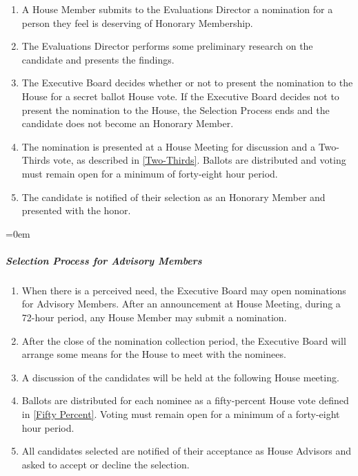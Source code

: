 \documentclass{article}
\newcommand{\asubsubsubsection}[1]{\parindent=0em\subparagraph{#1} \label{#1}}
\begin{document}
\begin{enumerate}
	\item A House Member submits to the Evaluations Director a nomination for a person they feel is deserving of Honorary Membership.
	\item The Evaluations Director performs some preliminary research on the candidate and presents the findings.
	\item The Executive Board decides whether or not to present the nomination to the House for a secret ballot House vote.
		If the Executive Board decides not to present the nomination to the House, the Selection Process ends and the candidate does not become an Honorary Member.
	\item The nomination is presented at a House Meeting for discussion and a Two-Thirds vote, as described in \ref{Two-Thirds}.
		Ballots are distributed and voting must remain open for a minimum of forty-eight hour period.
	\item The candidate is notified of their selection as an Honorary Member and presented with the honor.
\end{enumerate}
\asubsubsubsection{Selection Process for Advisory Members}
\begin{enumerate}
	\item When there is a perceived need, the Executive Board may open nominations for Advisory Members.
		After an announcement at House Meeting, during a 72-hour period, any House Member may submit a nomination.
	\item After the close of the nomination collection period, the Executive Board will arrange some means for the House to meet with the nominees.
	\item A discussion of the candidates will be held at the following House meeting.
	\item Ballots are distributed for each nominee as a fifty-percent House vote defined in \ref{Fifty Percent}.
		Voting must remain open for a minimum of a forty-eight hour period.
	\item All candidates selected are notified of their acceptance as House Advisors and asked to accept or decline the selection.
\end{enumerate}
\end{document}
